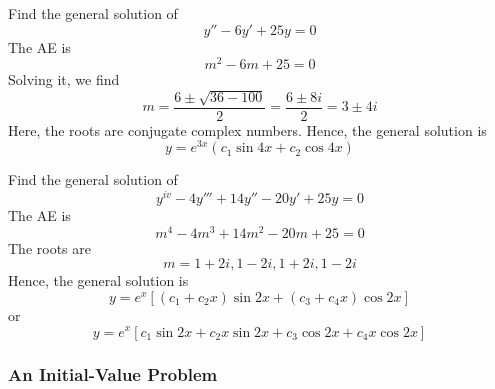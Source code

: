 \begin{example}{Find the general solution of \[
    y'' - 6y' + 25y = 0
\]}{}\vspace{-20pt}
    The AE is \[
        m^2 - 6m + 25 = 0
    \] Solving it, we find \[
        m = \frac{6 \pm \sqrt{36-100}}{2} = \frac{6\pm8i}{2} = 3 \pm 4i
    \]
    Here, the roots are conjugate complex numbers. Hence, the general solution is \[
        y = e^{3x}(c_1\sin{4x} + c_2\cos{4x})
    \]
\end{example}

\begin{example}{Find the general solution of \[
    y^{iv} - 4y''' + 14y'' - 20y' + 25y = 0
\]}{}\vspace{-20pt}
    The AE is \[
        m^4 - 4m^3 + 14m^2 - 20m + 25 = 0
    \]
    The roots are \[
        m = 1+2i, 1-2i, 1+2i, 1-2i
    \]
    Hence, the general solution is \[
        y = e^{x} [ (c_1+c_2x)\sin{2x} + (c_3+c_4x)\cos{2x} ]
    \] or \[
        y = e^{x} [ c_1\sin{2x} + c_2x\sin{2x} + c_3\cos{2x} + c_4x\cos{2x} ]
    \]
\end{example}

\vspace{20pt}
\subsubsection{An Initial-Value Problem}

